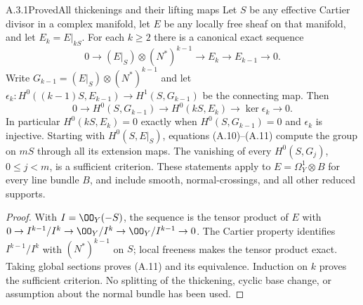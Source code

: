 \begin{statement}{A.3.1}{Proved}{All thickenings and their lifting maps}
Let $S$ be any effective Cartier divisor in a complex manifold, let $E$ be any locally free sheaf on that manifold, and let $E_k=E|_{kS}$. For each $k\ge2$ there is a canonical exact sequence
\[
0\longrightarrow (E|_S)\otimes(N^*)^{k-1}
 \longrightarrow E_k\longrightarrow E_{k-1}\longrightarrow0.
\tag{A.10}
\]
Write $G_{k-1}=(E|_S)\otimes(N^*)^{k-1}$ and let
$\epsilon_k:H^0((k-1)S,E_{k-1})\to H^1(S,G_{k-1})$
be the connecting map. Then
\[
0\longrightarrow H^0(S,G_{k-1})\longrightarrow H^0(kS,E_k)
 \longrightarrow\ker\epsilon_k\longrightarrow0.
\tag{A.11}
\]
In particular $H^0(kS,E_k)=0$ exactly when $H^0(S,G_{k-1})=0$ and $\epsilon_k$ is injective. Starting with $H^0(S,E|_S)$, equations (A.10)--(A.11) compute the group on $mS$ through all its extension maps. The vanishing of every $H^0(S,G_j)$, $0\le j<m$, is a sufficient criterion. These statements apply to $E=\Omega_Y^1\otimes B$ for every line bundle $B$, and include smooth, normal-crossings, and all other reduced supports.
\end{statement}
\begin{proof}
With $I=\OO_Y(-S)$, the sequence is the tensor product of $E$ with
$0\to I^{k-1}/I^k\to\OO_Y/I^k\to\OO_Y/I^{k-1}\to0$.
The Cartier property identifies $I^{k-1}/I^k$ with $(N^*)^{k-1}$ on $S$; local freeness makes the tensor product exact. Taking global sections proves (A.11) and its equivalence. Induction on $k$ proves the sufficient criterion. No splitting of the thickening, cyclic base change, or assumption about the normal bundle has been used.
\end{proof}

